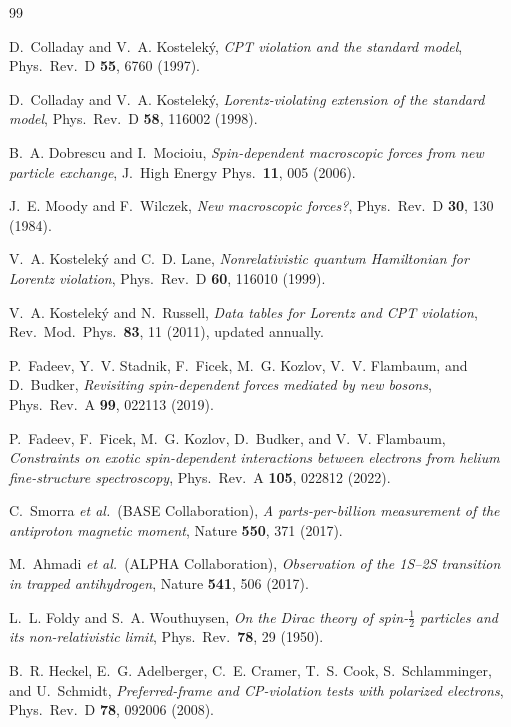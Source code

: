 \documentclass[12pt,a4paper]{report}
\begin{document}

\begin{thebibliography}{99}

D.~Colladay and V.~A. Kostelek\'{y},
\textit{CPT violation and the standard model},
Phys.\ Rev.\ D \textbf{55}, 6760 (1997).

D.~Colladay and V.~A. Kostelek\'{y},
\textit{Lorentz-violating extension of the standard model},
Phys.\ Rev.\ D \textbf{58}, 116002 (1998).

B.~A. Dobrescu and I.~Mocioiu,
\textit{Spin-dependent macroscopic forces from new particle exchange},
J.\ High Energy Phys.\ \textbf{11}, 005 (2006).

J.~E. Moody and F.~Wilczek,
\textit{New macroscopic forces?},
Phys.\ Rev.\ D \textbf{30}, 130 (1984).

V.~A. Kostelek\'{y} and C.~D. Lane,
\textit{Nonrelativistic quantum Hamiltonian for Lorentz violation},
Phys.\ Rev.\ D \textbf{60}, 116010 (1999).

V.~A. Kostelek\'{y} and N.~Russell,
\textit{Data tables for Lorentz and CPT violation},
Rev.\ Mod.\ Phys.\ \textbf{83}, 11 (2011), updated annually.

P.~Fadeev, Y.~V. Stadnik, F.~Ficek, M.~G. Kozlov, V.~V. Flambaum, and
D.~Budker,
\textit{Revisiting spin-dependent forces mediated by new bosons},
Phys.\ Rev.\ A \textbf{99}, 022113 (2019).

P.~Fadeev, F.~Ficek, M.~G. Kozlov, D.~Budker, and V.~V. Flambaum,
\textit{Constraints on exotic spin-dependent interactions between electrons from
helium fine-structure spectroscopy},
Phys.\ Rev.\ A \textbf{105}, 022812 (2022).

C.~Smorra \textit{et al.}\ (BASE Collaboration),
\textit{A parts-per-billion measurement of the antiproton magnetic moment},
Nature \textbf{550}, 371 (2017).

M.~Ahmadi \textit{et al.}\ (ALPHA Collaboration),
\textit{Observation of the 1S--2S transition in trapped antihydrogen},
Nature \textbf{541}, 506 (2017).

L.~L. Foldy and S.~A. Wouthuysen,
\textit{On the Dirac theory of spin-$\frac{1}{2}$ particles and its
non-relativistic limit},
Phys.\ Rev.\ \textbf{78}, 29 (1950).

B.~R. Heckel, E.~G. Adelberger, C.~E. Cramer, T.~S. Cook, S.~Schlamminger,
and U.~Schmidt,
\textit{Preferred-frame and CP-violation tests with polarized electrons},
Phys.\ Rev.\ D \textbf{78}, 092006 (2008).


\end{thebibliography}
\end{document}
